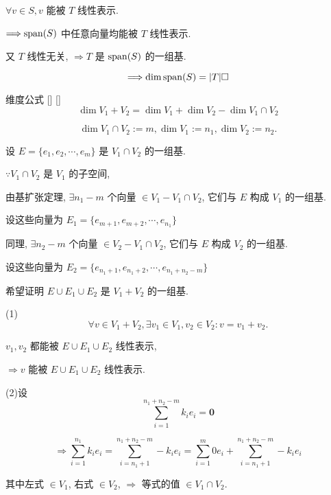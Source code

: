 \documentclass[UTF8]{ctexart}
\DeclareMathOperator{\0}{\mathbf{0}}
\DeclareMathOperator{\<}{\langle}
\renewcommand{\>}{\rangle}
\begin{document}
        \begin{prf}
			
			 \(\forall v\in S, v\) 能被 \(T\) 线性表示. 
			
			 \(\Longrightarrow {\rm span}(S)\) 中任意向量均能被 \(T\) 线性表示. 
			
			又 \(T\) 线性无关,  \(\Longrightarrow T\) 是 \({\rm span}(S)\) 的一组基. 
			
			\[\Longrightarrow \dim{\rm span}(S)=|T|\square\]
        \end{prf}
		
		\begin{thm}
			[]
			{ 维度公式}
			[]
			[]
			\[\dim V_{1}+V_{2}=\dim V_{1}+\dim V_{2}-\dim V_{1}\cap V_{2}\]
		\end{thm}

        \begin{prf}
			
			\[\dim V_1\cap V_2:=m, \dim V_{1}:=n_1, \dim V_{2}:=n_2. \]
			
			设 \(E=\{e_{1},e_{2},\cdots,e_{m}\}\) 是 \(V_1\cap V_2\) 的一组基. 
			
			 \(\because V_1\cap V_2\) 是 \(V_1\) 的子空间, 
			
			由基扩张定理,  \(\exists n_1-m\) 个向量 \(\in V_1-V_1\cap V_2\), 它们与 \(E\) 构成 \(V_1\) 的一组基. 
			
			设这些向量为 \(E_1=\{e_{m+1},e_{m+2},\cdots,e_{n_1}\}\) 
			
			同理,  \(\exists n_2-m\) 个向量 \(\in V_2-V_1\cap V_2\), 它们与 \(E\) 构成 \(V_2\) 的一组基. 
			
			设这些向量为 \(E_2=\{e_{n_1+1},e_{n_1+2},\cdots,e_{n_1+n_2-m}\}\) 
			
			希望证明 \(E\cup E_1\cup E_2\) 是 \(V_1+V_2\) 的一组基. 
			
			(1)\[\forall v\in V_1+V_2, \exists v_1\in V_1, v_2\in V_2: v=v_1+v_2. \]
			
			 \(v_1,v_2\) 都能被 \(E\cup E_1\cup E_2\) 线性表示, 
			
			 \(\Longrightarrow v\) 能被 \(E\cup E_1\cup E_2\) 线性表示. 
			
			(2)设\[\sum_{i=1}^{n_1+n_2-m}k_ie_i=\mathbf{0}\]
			
			\[\Longrightarrow\sum_{i=1}^{n_1}k_ie_i=\sum_{i=n_1+1}^{n_1+n_2-m}-k_ie_i=\sum_{i=1}^{m}0e_i+\sum_{i=n_1+1}^{n_1+n_2-m}-k_ie_i\]
			
			其中左式 \(\in V_1\), 右式 \(\in V_2\),  \(\Longrightarrow\) 等式的值 \(\in V_1\cap V_2\). 
			

\end{prf}
\end{document}
